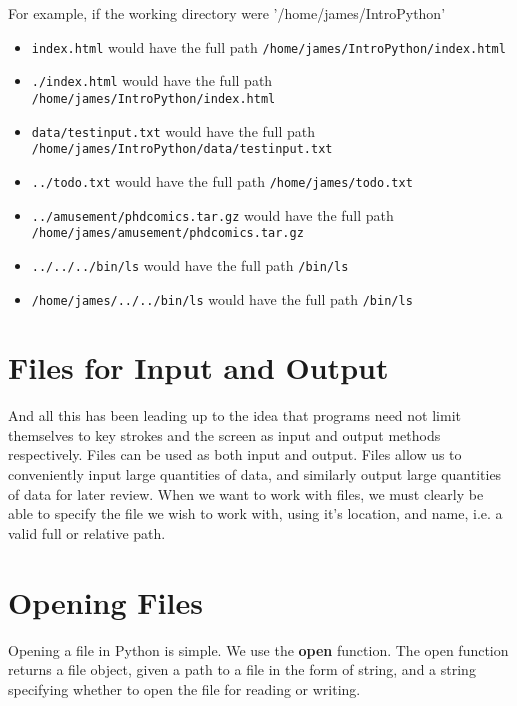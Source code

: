 \documentclass[a4paper,11pt]{article}
\begin{document}
For example, if the working directory were '/home/james/IntroPython'
\begin{itemize}
	\item 
\texttt{index.html} would have the full path 
\texttt{/home/james/IntroPython/index.html}
	\item 
\texttt{./index.html} would have the full path 
\texttt{/home/james/IntroPython/index.html}
	\item 
\texttt{data/testinput.txt} would have the full path 
\texttt{/home/james/IntroPython/data/testinput.txt}
	\item 
\texttt{../todo.txt} would have the full path 
\texttt{/home/james/todo.txt}
	\item 
\texttt{../amusement/phdcomics.tar.gz} would have the full path 
\texttt{/home/james/amusement/phdcomics.tar.gz}
	\item 
\texttt{../../../bin/ls} would have the full path 
\texttt{/bin/ls}
	\item 
\texttt{/home/james/../../bin/ls} would have the full path 
\texttt{/bin/ls}
\end{itemize}

\section{Files for Input and Output}

And all this has been leading up to the idea that programs need not   limit themselves to key strokes and the screen as input and output   methods respectively. Files can be used as both input and output. Files   allow us to conveniently input large quantities of data, and similarly   output large quantities of data for later review. When we want to work   with files, we must clearly be able to specify the file we wish to work   with, using it's location, and name, i.e. a valid full or relative   path.

\section{Opening Files}

Opening a file in Python is simple. We use the \textbf{open} function.   The open function returns a file object, given a path to a file in the form of string, and a string   specifying whether to open the file for reading or writing.
\end{document}
